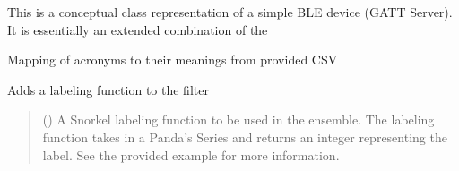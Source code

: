 \documentclass[letterpaper,10pt,english]{sphinxmanual}
\begin{document}
\begin{fulllineitems}
\label{\detokenize{filters:at_nlp.filters.string_filter.StringFilter}}
\pysigstartsignatures
{}
\pysigstopsignatures
\sphinxAtStartPar
This is a conceptual class representation of a simple BLE device
(GATT Server). It is essentially an extended combination of the

\begin{fulllineitems}
\label{\detokenize{filters:at_nlp.filters.string_filter.StringFilter.acronym_mapping}}
\pysigstartsignatures
{}
\pysigstopsignatures
\sphinxAtStartPar
Mapping of acronyms to their meanings from provided CSV

\end{fulllineitems}


\begin{fulllineitems}
\label{\detokenize{filters:at_nlp.filters.string_filter.StringFilter.add_labeling_fn}}
\pysigstartsignatures
{}
\pysigstopsignatures
\sphinxAtStartPar
Adds a labeling function to the filter
\begin{quote}\begin{description}
\sphinxAtStartPar
{} () \textendash{} A Snorkel labeling function to be used in the ensemble. The labeling
function takes in a Panda’s Series and returns an integer representing the label. See the provided
example for more information.


\end{description}
\end{quote}
\end{fulllineitems}
\end{fulllineitems}
\end{document}
